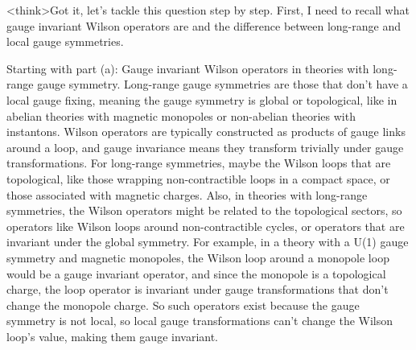 <think>Got it, let's tackle this question step by step. First, I need to recall what gauge invariant Wilson operators are and the difference between long-range and local gauge symmetries. 

Starting with part (a): Gauge invariant Wilson operators in theories with long-range gauge symmetry. Long-range gauge symmetries are those that don't have a local gauge fixing, meaning the gauge symmetry is global or topological, like in abelian theories with magnetic monopoles or non-abelian theories with instantons. Wilson operators are typically constructed as products of gauge links around a loop, and gauge invariance means they transform trivially under gauge transformations. For long-range symmetries, maybe the Wilson loops that are topological, like those wrapping non-contractible loops in a compact space, or those associated with magnetic charges. Also, in theories with long-range symmetries, the Wilson operators might be related to the topological sectors, so operators like Wilson loops around non-contractible cycles, or operators that are invariant under the global symmetry. For example, in a theory with a U(1) gauge symmetry and magnetic monopoles, the Wilson loop around a monopole loop would be a gauge invariant operator, and since the monopole is a topological charge, the loop operator is invariant under gauge transformations that don't change the monopole charge. So such operators exist because the gauge symmetry is not local, so local gauge transformations can't change the Wilson loop's value, making them gauge invariant.

